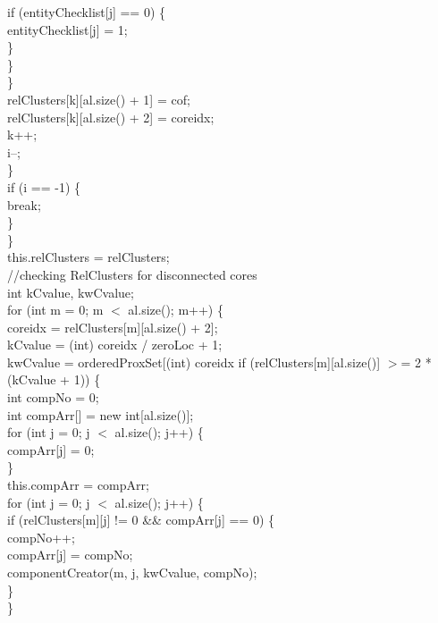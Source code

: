 \begin{ttfamily   }
\begin{scriptsize}
                        if (entityChecklist[j] == 0) \{\\
                            entityChecklist[j] = 1;\\
                        \}\\
                    \}\\
                \}\\
                relClusters[k][al.size() + 1] = cof;\\
                relClusters[k][al.size() + 2] = coreidx;\\
                k++;\\
                i--;\\
            \}\\
            if (i == -1) \{\\
                break;\\
            \}\\
        \}\\
        this.relClusters = relClusters;\\


        \noindent//checking RelClusters for disconnected cores\\
        int kCvalue, kwCvalue;\\
        \noindent for (int m = 0;    m $<$ al.size();    m++) \{\\
            coreidx = relClusters[m][al.size() + 2];\\
            kCvalue = (int) coreidx / zeroLoc + 1;\\
            kwCvalue = orderedProxSet[(int) coreidx %
            if (relClusters[m][al.size()] $>$= 2 * (kCvalue + 1)) \{\\
                int compNo = 0;\\
                int compArr[] = new int[al.size()];\\
                \noindent for (int j = 0;   j $<$ al.size();   j++) \{\\
                    compArr[j] = 0;\\
                \}\\
                this.compArr = compArr;\\

                \noindent for (int j = 0;   j $<$ al.size();   j++) \{\\
                    if (relClusters[m][j] != 0 \&\& compArr[j] == 0) \{\\
                        compNo++;\\
                        compArr[j] = compNo;\\
                        componentCreator(m, j, kwCvalue, compNo);\\
                    \}\\
                \}\\


\end{scriptsize}
\end{ttfamily   }
